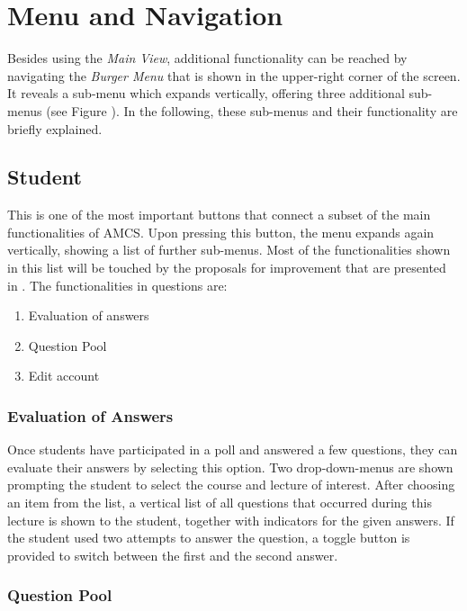 \section{Menu and Navigation}
Besides using the \emph{Main View}, additional functionality can be reached by navigating the \emph{Burger Menu} that is shown in the upper-right corner of the screen. It reveals a sub-menu which expands vertically, offering three additional sub-menus (see Figure \todosct). In the following, these sub-menus and their functionality are briefly explained.

\subsection{Student}

This is one of the most important buttons that connect a subset of the main functionalities of AMCS. Upon pressing this button, the menu expands again vertically, showing a list of further sub-menus. Most of the functionalities shown in this list will be touched by the proposals for improvement that are presented in . The functionalities in questions are:

\begin{enumerate}
	\item Evaluation of answers
	\item Question Pool
	\item Edit account
\end{enumerate}

\subsubsection{Evaluation of Answers}
\label{sec:soa:eval_of_answers}
Once students have participated in a poll and answered a few questions, they can evaluate their answers by selecting this option. Two drop-down-menus are shown prompting the student to select the course and lecture of interest. 
After choosing an item from the list, a vertical list of all questions that occurred during this lecture is shown to the student, together with indicators for the given answers.
If the student used two attempts to answer the question, a toggle button is provided to switch between the first and the second answer. \todogrf

\subsubsection{Question Pool}

